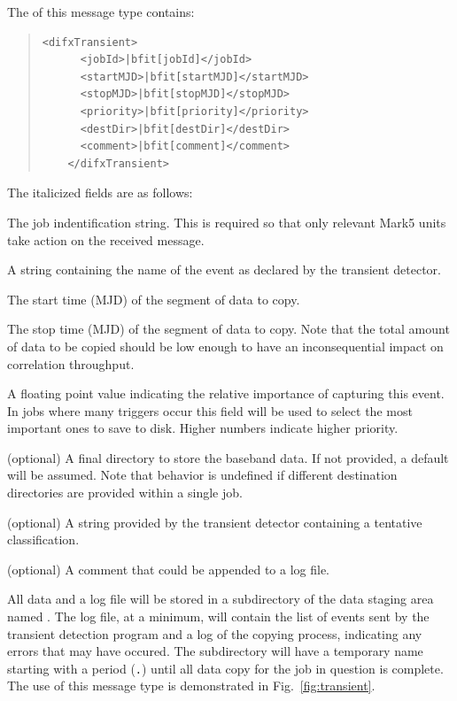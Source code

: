 \begin{description}
The  of this message type contains:

\begin{quotation}
\begin{Verbatim}[commandchars=\|\[\]]
    <difxTransient>
      <jobId>|bfit[jobId]</jobId>
      <startMJD>|bfit[startMJD]</startMJD>
      <stopMJD>|bfit[stopMJD]</stopMJD>
      <priority>|bfit[priority]</priority>
      <destDir>|bfit[destDir]</destDir>
      <comment>|bfit[comment]</comment>
    </difxTransient>
\end{Verbatim}
\end{quotation}

\noindent The italicized fields are as follows:

\begin{description}
\item{} The job indentification string.
This is required so that only relevant Mark5 units take action on the received message.
\item{} A string containing the name of the event as declared by the transient detector.
\item{} The start time (MJD) of the segment of data to copy.
\item{} The stop time (MJD) of the segment of data to copy.
Note that the total amount of data to be copied should be low enough to have an inconsequential impact on correlation throughput.
\item{} A floating point value indicating the relative importance of capturing this event.
In jobs where many triggers occur this field will be used to select the most important ones to save to disk.
Higher numbers indicate higher priority.
\item{} (optional) A final directory to store the baseband data.
If not provided, a default will be assumed.
Note that behavior is undefined if different destination directories are provided within a single job.
\item{} (optional) A string provided by the transient detector containing a tentative classification.
\item{} (optional) A comment that could be appended to a log file.
\end{description}

All data and a log file will be stored in a subdirectory of the data staging area named .
The log file, at a minimum, will contain the list of events sent by the transient detection program and a log of the copying process, indicating any errors that may have occured.
The subdirectory will have a temporary name starting with a period ({\tt .}) until all data copy for the job in question is complete.
The use of this message type is demonstrated in Fig.~\ref{fig:transient}.


\end{description}
